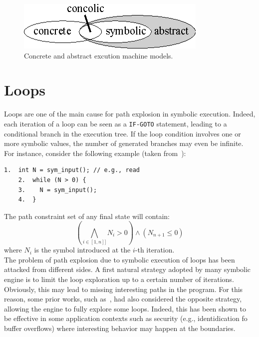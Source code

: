 
\begin{figure}[t]
\centering
\includegraphics[width=0.35\columnwidth]{images/concrete-abstract.eps} 
\caption{Concrete and abstract excution machine models.}
\label{fig:concrete-symbolic}
\end{figure}




\section{Loops}
\label{se:loops}

Loops are one of the main cause for path explosion in symbolic execution. Indeed, each iteration of a loop can be seen as a {\tt IF-GOTO} statement, leading to a conditional branch in the execution tree. If the loop condition involves one or more symbolic values, the number of generated branches may even be infinite. For instance, consider the following example (taken from~\cite{CS-CACM13}):
    \begin{lstlisting}[basicstyle=\ttfamily\small]
    1.  int N = sym_input(); // e.g., read
    2.  while (N > 0) {
    3.    N = sym_input();  
    4.  }
    \end{lstlisting}
The path constraint set of any final state will contain:
  \[ \left ( \bigwedge_{i \in [1, n]]} N_i > 0 \right ) \wedge (N_{n+1} \leq 0) \]
where $N_i$ is the symbol introduced at the $i$-th iteration.\\

The problem of path explosion due to symbolic execution of loops has been attacked from different sides. A first natural strategy adopted by many symbolic engine is to limit the loop exploration up to a certain number of iterations. Obviously, this may lead to missing interesting paths in the program. For this reason, some prior works, such as~\cite{AEG-NDSS11}, had also considered the opposite strategy, allowing the engine to fully explore some loops. Indeed, this has been shown to be effective in some application contexts such as security (e.g., identidication fo buffer overflows) where interesting behavior may happen at the boundaries.

